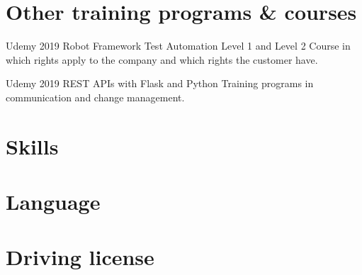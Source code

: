 \documentclass{sobCV}[2017/07/08]
\begin{document}
   \section{Other training programs \& courses}
      \coursenode
      {Udemy}
      {2019}
      {Robot Framework Test Automation Level 1 and Level 2}{%
         Course in which rights apply to the company and which rights the customer have.
      }

   \coursenode
      {Udemy}
      {2019}
      {REST APIs with Flask and Python}{%
         Training programs in communication and change management.
      }

   \section{Skills}


   \section{Language}

   \section{Driving license}
\end{document}

